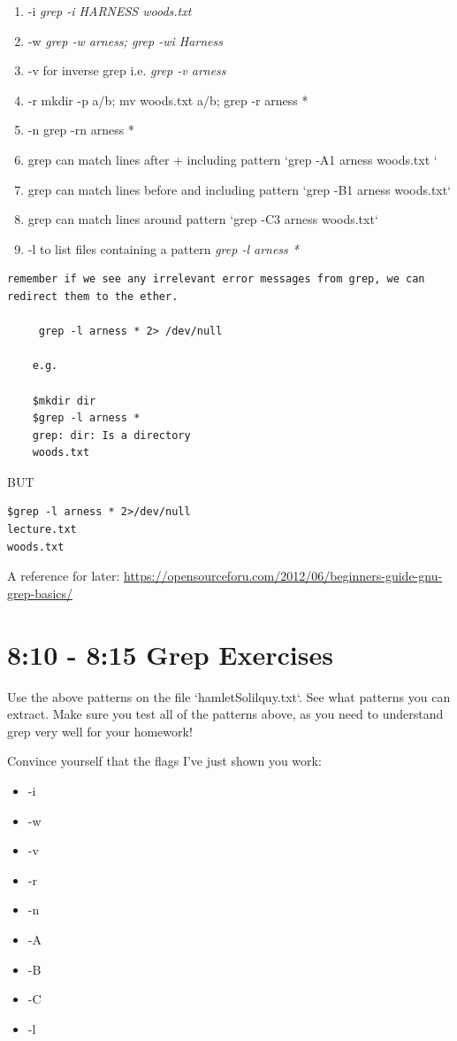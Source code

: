 \documentclass[10pt]{article}
\begin{document}
\begin{enumerate}
\item -i \textit{grep -i HARNESS woods.txt}
\item -w \textit{grep -w arness; grep -wi Harness} 
\item -v for inverse grep i.e. \textit{grep -v arness} 
\item -r mkdir -p a/b; mv woods.txt a/b; grep -r arness *
\item -n grep -rn arness *
\item grep can match lines after + including pattern `grep -A1 arness woods.txt `
\item grep can match lines before and including pattern  `grep -B1 arness woods.txt`
\item grep can match lines around pattern `grep -C3 arness woods.txt`
\item -l to list files containing a pattern \textit{ grep -l arness * }
\end{enumerate}

\begin{verbatim}
remember if we see any irrelevant error messages from grep, we can redirect them to the ether.

     grep -l arness * 2> /dev/null

    e.g.
    
	$mkdir dir
    $grep -l arness *
    grep: dir: Is a directory
    woods.txt
\end{verbatim}   
 
    BUT

\begin{lstlisting}[style=term]    
$grep -l arness * 2>/dev/null
lecture.txt
woods.txt
\end{lstlisting}

A reference for later:
\url{https://opensourceforu.com/2012/06/beginners-guide-gnu-grep-basics/}

\section{8:10 - 8:15 Grep Exercises}
 
Use the above patterns on the file `hamletSolilquy.txt`. See what patterns you can extract. Make sure you test all of the patterns above, as you need to understand grep very well for your homework!

Convince yourself that the flags I've just shown you work:
\begin{itemize}
\item -i
\item -w
\item -v
\item -r
\item -n
\item -A
\item -B
\item -C
\item -l
\end{itemize}
\end{document}
